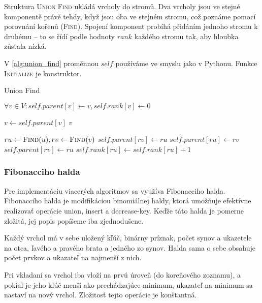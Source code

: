 Struktura \textsc{Union Find} ukládá vrcholy do stromů.
Dva vrcholy jsou ve stejné komponentě právě tehdy, když jsou oba
ve stejném stromu, což poznáme pomocí porovnání kořenů (\textsc{Find}).
Spojení komponent probíhá přidáním jednoho stromu k druhému -- to se
řídí podle hodnoty $rank$ každého stromu tak, aby hloubka zůstala nízká.

V \autoref{alg:union_find} proměnnou $self$ používáme ve smyslu jako v
Pythonu. Funkce \textsc{Initialize} je konstruktor.

\begin{algorithm}[H]
\caption{Union Find}
\label{alg:union_find}
\begin{algorithmic}[1]
    \State $\forall v \in V : self.parent[v] \gets v, self.rank[v] \gets 0$
\EndFunction

        \State $v \gets self.parent[v]$
    \EndWhile
    \State \Return $v$
\EndFunction

    \State $ru \gets \Call{Find}{u}, rv \gets \Call{Find}{v}$
            \State $self.parent[rv] \gets ru$
            \State $self.parent[ru] \gets rv$
        \Else
            \State $self.parent[rv] \gets ru$
            \State $self.rank[ru] \gets self.rank[ru] + 1$
        \EndIf
    \EndIf
\EndFunction

\end{algorithmic}
\end{algorithm}

\subsubsection*{Fibonacciho halda}

Pre implementáciu viacerých algoritmov sa využíva Fibonacciho halda.
Fibonacciho halda je modifikáciou binomiálnej haldy, ktorá umožňuje
efektívne realizovať operácie union, insert a decrease-key.
Keďže táto halda je pomerne zložitá, jej popis popíšeme iba zjednodušene.

Každý vrchol má v sebe uložený kľúč, binárny príznak, počet synov
a ukazetele na otca, ľavého a pravého brata a jedného zo synov.
Halda sama o sebe obsahuje počet prvkov a ukazateľ na najmenší z nich.

Pri vkladaní sa vrchol iba vloží na prvú úroveň (do koreňového zoznamu), 
a pokiaľ je jeho kľúč menší ako prechádzajúce minimum, ukazateľ
na minimum sa nastaví na nový vrchol. Zložitosť tejto operácie je konštantná.

